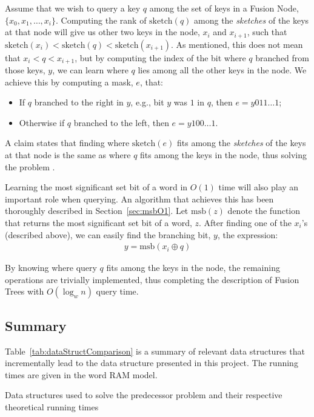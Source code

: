 Assume that we wish to query a key $q$ among the set of keys in a Fusion Node, $\{x_0, x_1, \dots, x_i\}$.
Computing the rank of $\text{sketch}(q)$ among the \textit{sketches} of the keys at that node will give us other two keys in the node, $x_i$ and $x_{i+1}$, such that $\text{sketch}(x_i) < \text{sketch}(q) < \text{sketch}(x_{i+1})$.
As mentioned, this does not mean that $x_i < q < x_{i+1}$, but by computing the index of the bit where $q$ branched from those keys, $y$, we can learn where $q$ lies among all the other keys in the node.
We achieve this by computing a mask, $e$, that:
\begin{itemize}
    \item
    If $q$ branched to the right in $y$, e.g., bit $y$ was $1$ in $q$, then $e = y011\dots1$;
    
    \item
    Otherwise if $q$ branched to the left, then $e = y100\dots1$.
\end{itemize}
A claim states that finding where $\text{sketch}(e)$ fits among the \textit{sketches} of the keys at that node is the same as where $q$ fits among the keys in the node, thus solving the problem \cite{nelsonjelanilec2}.

Learning the most significant set bit of a word in $O(1)$ time will also play an important role when querying. An algorithm that achieves this has been thoroughly described in Section~\ref{sec:msbO1}.
Let $\text{msb}(z)$ denote the function that returns the most significant set bit of a word, $z$. After finding one of the $x_i$'s (described above), we can easily find the branching bit, $y$, the expression:
\begin{align*}
    y = \text{msb}(x_i \oplus q)
\end{align*}

By knowing where query $q$ fits among the keys in the node, the remaining operations are trivially implemented, thus completing the description of Fusion Trees with $O(\log_w n)$ query time.

\subsection{Summary}

Table~\ref{tab:dataStructComparison} is a summary of relevant data structures that incrementally lead to the data structure presented in this project. The running times are given in the word RAM model.

\begin{table}[H]
\centering

\caption[Predecessor problem data structure comparison]{Data structures used to solve the predecessor problem and their respective theoretical running times}
\label{tab:dataStructComparison}
\end{table}

